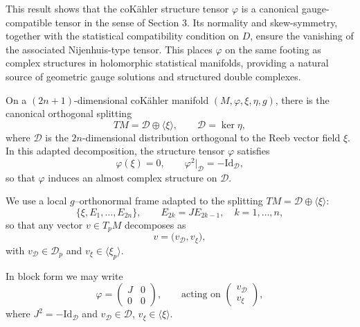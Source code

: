 \begin{rem}
This result shows that the coKähler structure tensor \(\varphi\) is a canonical gauge-compatible tensor in the sense of Section 3. Its normality and skew-symmetry, together with the statistical compatibility condition on \(D\), ensure the vanishing of the associated Nijenhuis-type tensor. This places \(\varphi\) on the same footing as complex structures in holomorphic statistical manifolds, providing a natural source of geometric gauge solutions and structured double complexes.
\end{rem}
On a $(2n+1)$-dimensional coKähler manifold 
\((M,\varphi,\xi,\eta,g)\), there is the canonical orthogonal splitting
\[
TM = \mathcal{D} \oplus \langle \xi \rangle,
\qquad \mathcal{D} = \ker \eta,
\]
where $\mathcal{D}$ is the $2n$-dimensional distribution orthogonal to the Reeb vector field $\xi$.
In this adapted decomposition, the structure tensor $\varphi$ satisfies
\[
\varphi(\xi) = 0, \qquad \varphi^2|_{\mathcal{D}} = -\mathrm{Id}_{\mathcal{D}},
\]
so that $\varphi$ induces an almost complex structure on $\mathcal{D}$.

We use a local $g$--orthonormal frame adapted to the splitting 
$TM = \mathcal{D} \oplus \langle \xi \rangle$:
\[
\{\xi, E_1, \dots, E_{2n}\}, \qquad E_{2k} = J E_{2k-1}, \quad k=1,\dots,n,
\]
so that any vector $v \in T_p M$ decomposes as
\[
v = \big(v_{\mathcal{D}}, v_{\xi}\big),
\]
with $v_{\mathcal{D}} \in \mathcal{D}_p$ and $v_{\xi} \in \langle \xi_p \rangle$.

In block form we may write
\[
\varphi = 
\begin{pmatrix}
J & 0 \\[4pt]
0 & 0
\end{pmatrix},
\qquad 
\text{acting on }
\begin{pmatrix}
v_{\mathcal{D}} \\[2pt]
v_{\xi}
\end{pmatrix},
\]
where $J^2 = -\mathrm{Id}_{\mathcal{D}}$ and $v_{\mathcal{D}} \in \mathcal{D}$, 
$v_{\xi} \in \langle \xi \rangle$.

